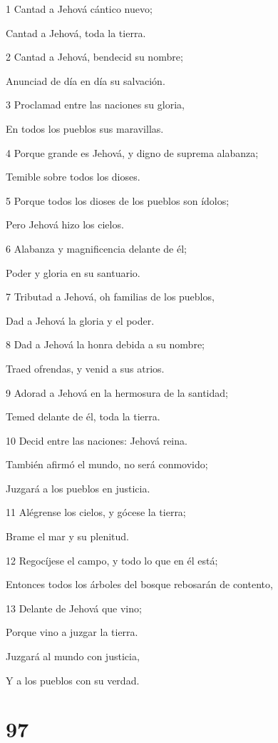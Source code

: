 \par 1 Cantad a Jehová cántico nuevo;
\par Cantad a Jehová, toda la tierra.
\par 2 Cantad a Jehová, bendecid su nombre;
\par Anunciad de día en día su salvación.
\par 3 Proclamad entre las naciones su gloria,
\par En todos los pueblos sus maravillas.
\par 4 Porque grande es Jehová, y digno de suprema alabanza;
\par Temible sobre todos los dioses.
\par 5 Porque todos los dioses de los pueblos son ídolos;
\par Pero Jehová hizo los cielos.
\par 6 Alabanza y magnificencia delante de él;
\par Poder y gloria en su santuario.
\par 7 Tributad a Jehová, oh familias de los pueblos,
\par Dad a Jehová la gloria y el poder.
\par 8 Dad a Jehová la honra debida a su nombre;
\par Traed ofrendas, y venid a sus atrios.
\par 9 Adorad a Jehová en la hermosura de la santidad; 
\par Temed delante de él, toda la tierra.
\par 10 Decid entre las naciones: Jehová reina.
\par También afirmó el mundo, no será conmovido;
\par Juzgará a los pueblos en justicia.
\par 11 Alégrense los cielos, y gócese la tierra;
\par Brame el mar y su plenitud.
\par 12 Regocíjese el campo, y todo lo que en él está;
\par Entonces todos los árboles del bosque rebosarán de contento,
\par 13 Delante de Jehová que vino;
\par Porque vino a juzgar la tierra.
\par Juzgará al mundo con justicia,
\par Y a los pueblos con su verdad.

\chapter{97}

